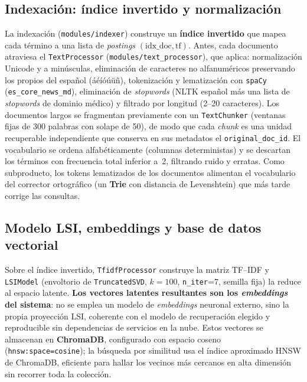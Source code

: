 \documentclass[runningheads,a4paper,14pts]{llncs}
\begin{document}
	\subsection{Indexación: índice invertido y normalización}
	
	La indexación (\texttt{modules/indexer}) construye un \textbf{índice invertido}
	que mapea cada término a una lista de \emph{postings} $(\text{idx\_doc},
	\text{tf})$. Antes, cada documento atraviesa el \texttt{TextProcessor}
	(\texttt{modules/text\_processor}), que aplica: normalización Unicode y a
	minúsculas, eliminación de caracteres no alfanuméricos preservando los propios
	del español (áéíóúüñ), tokenización y lematización con \texttt{spaCy}
	(\texttt{es\_core\_news\_md}), eliminación de \emph{stopwords} (NLTK español más
	una lista de \emph{stopwords} de dominio médico) y filtrado por longitud
	(2--20 caracteres). Los documentos largos se fragmentan previamente con un
	\texttt{TextChunker} (ventanas fijas de 300 palabras con solape de 50), de modo
	que cada \emph{chunk} es una unidad recuperable independiente que conserva en sus
	metadatos el \texttt{original\_doc\_id}. El vocabulario se ordena
	alfabéticamente (columnas deterministas) y se descartan los términos con
	frecuencia total inferior a~2, filtrando ruido y erratas. Como subproducto, los
	tokens lematizados de los documentos alimentan el vocabulario del corrector
	ortográfico (un \textbf{Trie} con distancia de Levenshtein) que más tarde corrige
	las consultas.
	
	\subsection{Modelo LSI, embeddings y base de datos vectorial}
	
	Sobre el índice invertido, \texttt{TfidfProcessor} construye la matriz TF--IDF y
	\texttt{LSIModel} (envoltorio de \texttt{TruncatedSVD}, $k=100$,
	\texttt{n\_iter}=7, semilla fija) la reduce al espacio latente. \textbf{Los
		vectores latentes resultantes son los \emph{embeddings} del sistema}: no se
	emplea un modelo de \emph{embeddings} neuronal externo, sino la propia proyección
	LSI, coherente con el modelo de recuperación elegido y reproducible sin
	dependencias de servicios en la nube. Estos vectores se almacenan en
	\textbf{ChromaDB}, configurado con espacio coseno (\texttt{hnsw:space=cosine}); la
	búsqueda por similitud usa el índice aproximado HNSW de ChromaDB, eficiente para
	hallar los vecinos más cercanos en alta dimensión sin recorrer toda la colección.
	
\end{document}
